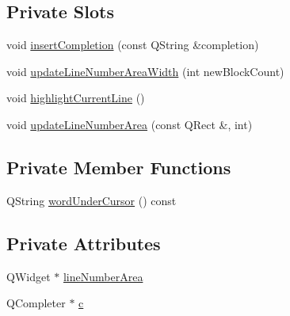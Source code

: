 \subsection*{Private Slots}
\begin{DoxyCompactItemize}
\item 
void \hyperlink{class_file_gui_a5b90c98b648fc77ef8474152e6632af3}{insert\-Completion} (const Q\-String \&completion)
\item 
void \hyperlink{class_file_gui_a498aa60814cc9265695e656e9b7a2e87}{update\-Line\-Number\-Area\-Width} (int new\-Block\-Count)
\item 
void \hyperlink{class_file_gui_a04e7291acb7167a70377f53dd7bd47f4}{highlight\-Current\-Line} ()
\item 
void \hyperlink{class_file_gui_ae1ce22662fb60a146101e8768acca3f1}{update\-Line\-Number\-Area} (const Q\-Rect \&, int)
\end{DoxyCompactItemize}
\subsection*{Private Member Functions}
\begin{DoxyCompactItemize}
\item 
Q\-String \hyperlink{class_file_gui_a3d263213e8a442878876eef041325493}{word\-Under\-Cursor} () const 
\end{DoxyCompactItemize}
\subsection*{Private Attributes}
\begin{DoxyCompactItemize}
\item 
Q\-Widget $\ast$ \hyperlink{class_file_gui_a4fa030b7bda34eeb961eac7324f28b88}{line\-Number\-Area}
\item 
Q\-Completer $\ast$ \hyperlink{class_file_gui_a71dfac2e67bf84af494667901b51ddc9}{c}
\end{DoxyCompactItemize}


